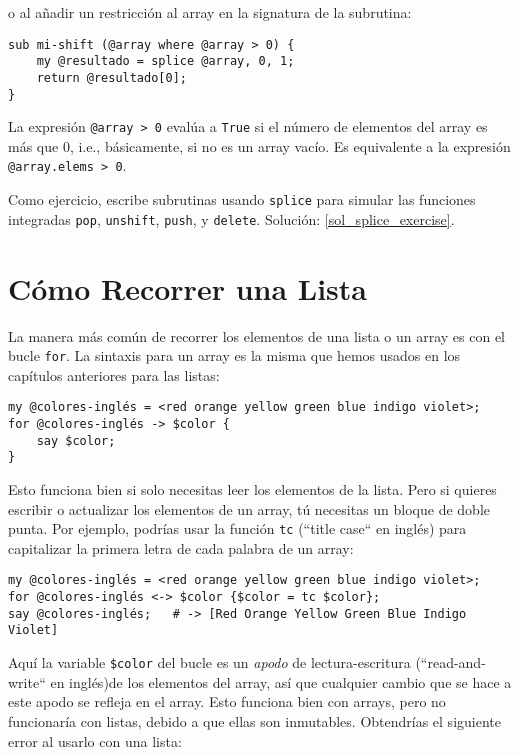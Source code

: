 o al añadir un restricción al array en la 
signatura de la subrutina:

\begin{lstlisting}
sub mi-shift (@array where @array > 0) {
    my @resultado = splice @array, 0, 1;
    return @resultado[0];
}    
\end{lstlisting}
%

La expresión \verb'@array > 0' evalúa a {\tt True} si el
número de elementos del array es más que 0, i.e., básicamente,
si no es un array vacío. Es equivalente a la expresión 
\verb|@array.elems > 0|.

\label{splice_exercise}
Como ejercicio, escribe subrutinas usando \verb|splice|
para simular las funciones integradas {\tt pop}, {\tt unshift}, 
{\tt push}, y {\tt delete}. Solución: \ref{sol_splice_exercise}.


\section{Cómo Recorrer una Lista}

La manera más común de recorrer los elementos de una lista
o un array es con el bucle {\tt for}. La sintaxis para un 
array es la misma que hemos usados en los capítulos
anteriores para las listas:

\begin{lstlisting}
my @colores-inglés = <red orange yellow green blue indigo violet>;
for @colores-inglés -> $color {
    say $color;
}
\end{lstlisting}
%
Esto funciona bien si solo necesitas leer los elementos de
la lista. Pero si quieres escribir o actualizar los elementos
de un array, tú necesitas un bloque de doble punta. Por ejemplo,
podrías usar la función {\tt tc} (``title case`` en inglés) para
capitalizar la primera letra de cada palabra de un array:

\begin{lstlisting}
my @colores-inglés = <red orange yellow green blue indigo violet>;
for @colores-inglés <-> $color {$color = tc $color};
say @colores-inglés;   # -> [Red Orange Yellow Green Blue Indigo Violet]
\end{lstlisting}
%
Aquí la variable \verb|$color| del bucle es un \emph{apodo} 
de lectura-escritura (``read-and-write`` en inglés)de 
los elementos del array, así que cualquier cambio 
que se hace a este apodo se refleja en el array. Esto funciona
bien con arrays, pero no funcionaría con listas, debido a que 
ellas son inmutables. Obtendrías el siguiente error al usarlo
con una lista:

